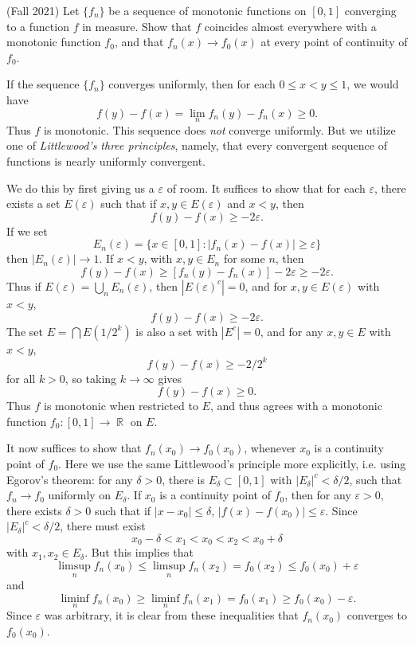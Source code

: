 \documentclass[answers]{exam}
\DeclareMathOperator{\RR}{\mathbb{R}}
\theoremstyle{problemstyle}
\newcommand{\1}[1]{\textbf{1}_{\left[#1\right]}} %
\begin{document}
\begin{questions}
\question (Fall 2021) Let $\{ f_n \}$ be a sequence of monotonic functions on $[0,1]$ converging to a function $f$ in measure. Show that $f$ coincides almost everywhere with a monotonic function $f_0$, and that $f_n(x) \to f_0(x)$ at every point of continuity of $f_0$.
\begin{solution}
	If the sequence $\{ f_n \}$ converges uniformly, then for each $0 \leq x < y \leq 1$, we would have
	\[ f(y) - f(x) = \lim_n f_n(y) - f_n(x) \geq 0. \]
	Thus $f$ is monotonic. This sequence does \emph{not} converge uniformly. But we utilize one of \emph{Littlewood's three principles}, namely, that every convergent sequence of functions is nearly uniformly convergent.

	We do this by first giving us a $\varepsilon$ of room. It suffices to show that for each $\varepsilon$, there exists a set $E(\varepsilon)$ such that if $x,y \in E(\varepsilon)$ and $x < y$, then
	\[ f(y) - f(x) \geq - 2 \varepsilon. \]
	If we set
	\[ E_n(\varepsilon) = \{ x \in [0,1] : |f_n(x) - f(x)| \geq \varepsilon \} \]
	then $|E_n(\varepsilon)| \to 1$. If $x < y$, with $x,y \in E_n$ for some $n$, then
	\[ f(y) - f(x) \geq [f_n(y) - f_n(x)] - 2 \varepsilon \geq -2\varepsilon. \]
	Thus if $E(\varepsilon) = \bigcup_n E_n(\varepsilon)$, then $|E(\varepsilon)^c| = 0$, and for $x,y \in E(\varepsilon)$ with $x < y$,
	\[ f(y) - f(x) \geq - 2 \varepsilon. \]
	The set $E = \bigcap E(1/2^k)$ is also a set with $|E^c| = 0$, and for any $x,y \in E$ with $x < y$,
	\[ f(y) - f(x) \geq - 2 / 2^k \]
	for all $k > 0$, so taking $k \to \infty$ gives
	\[ f(y) - f(x) \geq 0. \]
	Thus $f$ is monotonic when restricted to $E$, and thus agrees with a monotonic function $f_0: [0,1] \to \RR$ on $E$.

	It now suffices to show that $f_n(x_0) \to f_0(x_0)$, whenever $x_0$ is a continuity point of $f_0$. Here we use the same Littlewood's principle more explicitly, i.e. using Egorov's theorem: for any $\delta > 0$, there is $E_\delta \subset [0,1]$ with $|E_\delta|^c < \delta/2$, such that $f_n \to f_0$ uniformly on $E_\delta$. If $x_0$ is a continuity point of $f_0$, then for any $\varepsilon > 0$, there exists $\delta > 0$ such that if $|x - x_0| \leq \delta$, $|f(x) - f(x_0)| \leq \varepsilon$. Since $|E_\delta|^c < \delta/2$, there must exist
	\[ x_0 - \delta < x_1 < x_0 < x_2 < x_0 + \delta \]
	with $x_1,x_2 \in E_\delta$. But this implies that
	\[ \limsup_n f_n(x_0) \leq \limsup_n f_n(x_2) = f_0(x_2) \leq f_0(x_0) + \varepsilon \]
	and
	\[ \liminf_n f_n(x_0) \geq \liminf_n f_n(x_1) = f_0(x_1) \geq f_0(x_0) - \varepsilon. \]
	Since $\varepsilon$ was arbitrary, it is clear from these inequalities that $f_n(x_0)$ converges to $f_0(x_0)$.
\end{solution}


\end{questions}
\end{document}
